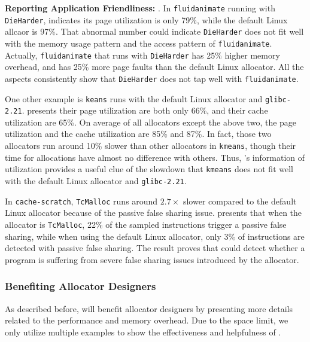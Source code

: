\textbf{Reporting Application Friendliness:} 
. 
In \texttt{fluidanimate} running with \texttt{DieHarder}, \MP{} indicates its page utilization is only 79\%, while the default Linux allcaor is 97\%. That abnormal number could indicate \texttt{DieHarder} does not fit well with the memory usage pattern and the access pattern of \texttt{fluidanimate}. Actually, \texttt{fluidanimate} that runs with \texttt{DieHarder} has 25\% higher memory overhead, and has 25\% more page faults than the default Linux allocator. All the aspects consistently show that \texttt{DieHarder} does not tap well with \texttt{fluidanimate}.

One other example is \texttt{keans} runs with the default Linux allocator and \texttt{glibc-2.21}. \MP{} presents their page utilization are both only 66\%, and their cache utilization are 65\%. On average of all allocators except the above two, the page utilization and the cache utilization are 85\% and 87\%. In fact, those two allocators run around 10\% slower than other allocators in \texttt{kmeans}, though their time for allocations have almost no difference with others. Thus, \MP{}'s information of utilization provides a useful clue of the slowdown that \texttt{kmeans} does not fit well with the default Linux allocator and \texttt{glibc-2.21}.

In \texttt{cache-scratch}, \texttt{TcMalloc} runs around $2.7\times$ slower compared to the default Linux allocator because of the passive false sharing issue.
\MP{} presents that when the allocator is \texttt{TcMalloc}, 22\% of the sampled instructions trigger a passive false sharing, while when using the default Linux allocator, only 3\% of instructions are detected with passive false sharing.
The result proves that \MP{} could detect whether a program is suffering from severe false sharing issues introduced by the allocator.

\subsubsection{Benefiting Allocator Designers}

As described before, \MP{} will benefit allocator designers by presenting more details related to the performance and memory overhead. Due to the space limit, we only utilize multiple examples to show the effectiveness and helpfulness of \MP{}. 




